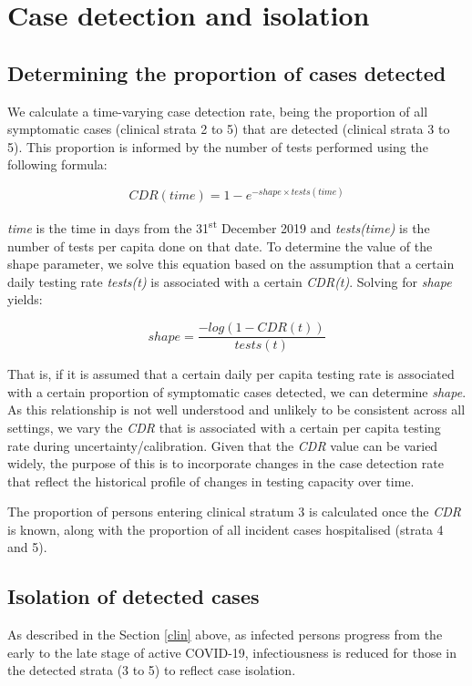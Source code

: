 \section{Case detection and isolation} \label{cdr}

\subsection{Determining the proportion of cases detected}
We calculate a time-varying case detection rate, being the proportion of all symptomatic cases (clinical strata 2 to 5) that are detected (clinical strata 3 to 5).
This proportion is informed by the number of tests performed using the following formula:

\[CDR(time)=1-e^{-shape \times tests(time)}\]

\textit{time} is the time in days from the 31\textsuperscript{st} December 2019 and \textit{tests(time)} is the number of tests per capita done on that date. To determine the value of the shape parameter, we solve this equation based on the assumption that a certain daily testing rate \textit{tests(t)} is associated with a certain \textit{CDR(t)}. Solving for \textit{shape} yields:

\[shape = \frac{-log(1 - CDR(t))}{tests(t)}\]

That is, if it is assumed that a certain daily per capita testing rate is associated with a certain proportion of symptomatic cases detected, we can determine \textit{shape}.
As this relationship is not well understood and unlikely to be consistent across all settings, we vary the \textit{CDR} that is associated with a certain per capita testing rate during uncertainty/calibration.
Given that the \textit{CDR} value can be varied widely, the purpose of this is to incorporate changes in the case detection rate that reflect the historical profile of changes in testing capacity over time.

The proportion of persons entering clinical stratum 3 is calculated once the \textit{CDR} is known, along with the proportion of all incident cases hospitalised (strata 4 and 5).

\subsection{Isolation of detected cases}
As described in the Section \ref{clin} above, as infected persons progress from the early to the late stage of active COVID-19, infectiousness is reduced for those in the detected strata (3 to 5) to reflect case isolation.

